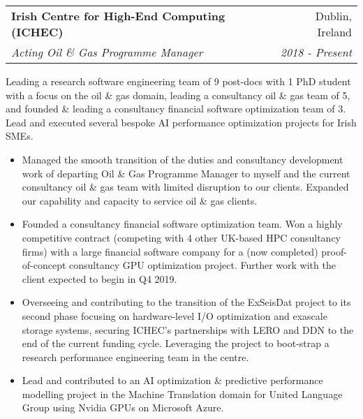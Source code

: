 \documentclass[11pt]{article}
\makeatletter
\newenvironment{resumeSubSectionHeader}{
    \par
    \begin{tabular*}{\textwidth}{l@{\extracolsep{\fill}}r}
    \par
} {
    \end{tabular*}
    \par
}
\newenvironment{resumeSubSectionBody}{
    \par
    \vspace{-0.4\parskip}
    \begin{small}
    \par
} {
    \par
    \end{small}
    \par
}
\newenvironment{resumeItemize}{
    \vspace{-0.5\baselineskip}
    \begin{itemize}
} {
    \end{itemize}
}
\makeatother
\begin{document}
\begin{resumeSubSectionHeader}

    \textbf{Irish Centre for High-End Computing (ICHEC)} & Dublin, Ireland \\
    \emph{Acting Oil \& Gas Programme Manager} & \emph{2018 - Present}

\end{resumeSubSectionHeader}
\begin{resumeSubSectionBody}

    Leading a research software engineering team of 9 post-docs with 1 PhD
    student with a focus on the oil \& gas domain,
    leading a consultancy oil \& gas team of 5,
    and founded \& leading a consultancy financial software optimization team of
    3.
    Lead and executed several bespoke AI performance optimization projects for
    Irish SMEs.

    \begin{resumeItemize}
        \item
            Managed the smooth transition of the duties and consultancy
            development work of departing Oil \& Gas Programme Manager to myself
            and the current consultancy oil \& gas team with limited disruption
            to our clients. Expanded our capability and capacity to service oil
            \& gas clients.

        \item
            Founded a consultancy financial software optimization team. Won a
            highly competitive contract (competing with 4 other UK-based HPC
            consultancy firms) with a large financial software company for a
            (now completed) proof-of-concept consultancy GPU optimization
            project.
            Further work with the client expected to begin in Q4 2019.

        \item
            Overseeing and contributing to the transition of the ExSeisDat
            project to its second phase focusing on hardware-level I/O
            optimization and exascale storage systems, securing ICHEC's
            partnerships with LERO and DDN to the end of the current funding
            cycle.
            Leveraging the project to boot-strap a research performance
            engineering team in the centre.

        \item
            Lead and contributed to an AI optimization \& predictive
            performance modelling project in the Machine Translation domain for
            United Language Group using Nvidia GPUs on Microsoft Azure.


\end{resumeItemize}
\end{resumeSubSectionBody}
\end{document}

